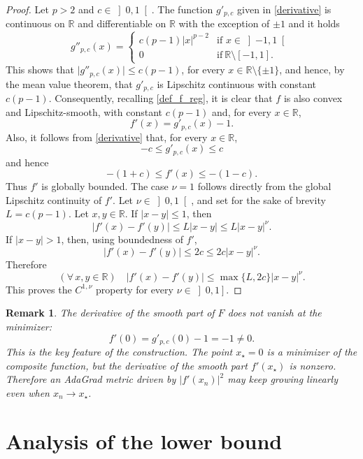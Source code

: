 \documentclass[11pt]{article}
\newtheorem{remark}{Remark}
\newcommand{\R}{\mathbb{R}}
\newcommand{\abs}[1]{\lvert{#1}\rvert}
\begin{document}
\begin{proof}
Let $p>2$ and $c\in \left]0,1\right[$.
The function $g'_{p,c}$ given in \eqref{derivative} is continuous on $\R$ and differentiable on $\R$
with the exception of $\pm 1$ and it holds
\begin{equation*}
    g''_{p,c}(x) =
\begin{cases}
    c(p-1)|x|^{p-2} &\text{if } x\in\left]-1,1\right[\\
    0 &\text{if}\ \R\setminus[-1,1].
\end{cases}
\end{equation*}
This shows that $\abs{g''_{p,c}(x)}\leq c(p-1)$, for every $x\in \R\setminus\{\pm 1\}$, and hence,
by the mean value theorem, that $g'_{p,c}$ is Lipschitz continuous with constant $c(p-1)$.
Consequently, recalling \eqref{def_f_reg}, it is clear that $f$ is also convex and Lipschitz-smooth, with constant $c(p-1)$ and, for every $x\in\R$,
\[
    f'(x)=g'_{p,c}(x)-1.
\]
Also, it follows from \eqref{derivative} that, for every $x\in\R$,
\[
    -c\le g'_{p,c}(x)\le c
\]
and hence
\[
    -(1+c)\le f'(x)\le -(1-c).
\]
Thus \(f'\) is globally bounded.
The case \(\nu=1\) follows directly from the global Lipschitz continuity of \(f'\). Let \(\nu\in\left]0,1\right[\), and set for the sake of brevity \(L=c(p-1)\). 
Let $x,y\in \R$.
If \(|x-y|\le1\), then
\[
    |f'(x)-f'(y)|
    \le
    L|x-y|
    \le
    L|x-y|^\nu.
\]
If \(|x-y|>1\), then, using boundedness of \(f'\),
\[
    |f'(x)-f'(y)|
    \le
    2c
    \le
    2c|x-y|^\nu.
\]
Therefore
\begin{equation*}
(\forall\,x,y\in \R)\quad
    \abs{f'(x)-f'(y)}
    \le
    \max\{L,2c\}|x-y|^\nu.
\end{equation*}
This proves the \(C^{1,\nu}\) property for every \(\nu\in\left]0,1\right]\).
\end{proof}

\begin{remark}
The derivative of the smooth part of $F$ does not vanish at the minimizer:
\[
    f'(0)=g'_{p,c}(0)-1=-1\neq0.
\]
This is the key feature of the construction. The point \(x_\star=0\) is a minimizer of the composite function, but the derivative of the smooth part \(f'(x_\star)\) is nonzero. Therefore an AdaGrad metric driven by \(|f'(x_n)|^2\) may keep growing linearly even when \(x_n\to x_\star\).
\end{remark}

\section{Analysis of the lower bound}
\end{document}
